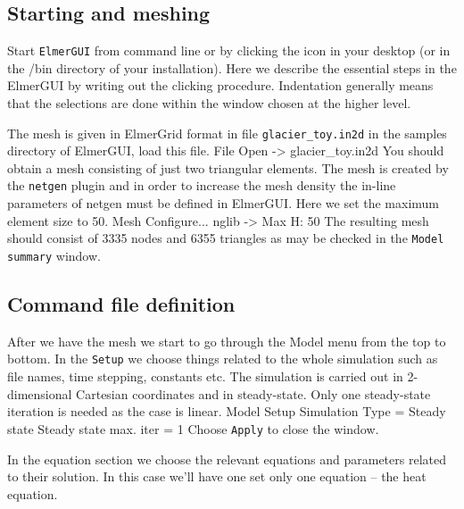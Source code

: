 \subsection*{Starting and meshing}

Start \texttt{ElmerGUI} from command line or by clicking the icon in your desktop (or in the /bin directory of your installation). 
Here we describe the essential steps in the ElmerGUI by writing out the clicking procedure. Indentation generally means that the 
selections are done within the window chosen at the higher level. 

The mesh is given in ElmerGrid format in file \texttt{glacier\_toy.in2d} in the samples directory of ElmerGUI, 
load this file.
\ttbegin
File 
  Open -> glacier\_toy.in2d
\ttend
You should obtain a mesh consisting of just two triangular elements. The mesh is created by the \texttt{netgen} plugin 
and in order to increase the mesh density the in-line parameters of netgen must be defined in ElmerGUI.
Here we set the maximum element size to 50. 
\ttbegin
Mesh
  Configure... 
    nglib -> Max H: 50
\ttend
The resulting mesh should consist of 3335 nodes and 6355 triangles as may be checked in the 
\texttt{Model summary} window.


\subsection*{Command file definition}

After we have the mesh we start to go through the Model menu from the top to bottom. 
In the \texttt{Setup} we choose things related to the whole simulation such as file names, 
time stepping, constants etc.
The simulation is carried out in 2-dimensional Cartesian coordinates and in steady-state. 
Only one steady-state iteration is needed as the case is linear. 
\ttbegin
Model
  Setup 
    Simulation Type = Steady state
    Steady state max. iter = 1
\ttend
Choose \texttt{Apply} to close the window.

In the equation section we choose the relevant equations and parameters related to their solution. 
In this case we'll have one set only one equation -- the heat equation.


